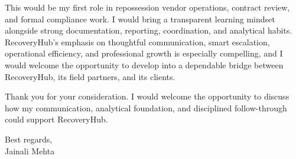 \documentclass[letterpaper,11pt]{article}
\begin{document}
\bigbreak
This would be my first role in repossession vendor operations, contract review, and formal compliance work. I would bring a transparent learning mindset alongside strong documentation, reporting, coordination, and analytical habits. RecoveryHub's emphasis on thoughtful communication, smart escalation, operational efficiency, and professional growth is especially compelling, and I would welcome the opportunity to develop into a dependable bridge between RecoveryHub, its field partners, and its clients.

\bigbreak
Thank you for your consideration. I would welcome the opportunity to discuss how my communication, analytical foundation, and disciplined follow-through could support RecoveryHub.

\bigbreak
Best regards,\\
Jainali Mehta
\end{document}

